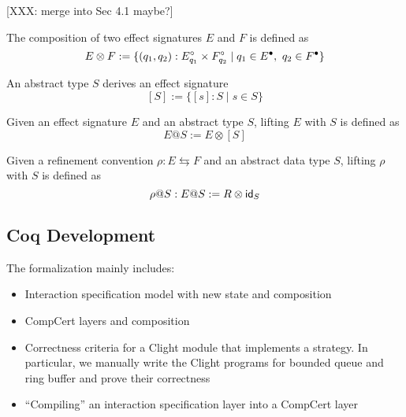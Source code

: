 \documentclass[acmsmall,review,anonymous]{acmart}\settopmatter{printfolios=true,printccs=false,printacmref=false}
\begin{document}
[XXX: merge into Sec 4.1 maybe?]

\begin{definition}
The composition of two effect signatures $E$ and $F$
is defined as
\[
  E\otimes F := \{ (q_1,q_2) : E^\circ_{q_1} \times F^\circ_{q_2} \mid q_1\in E^\bullet,\ q_2\in F^\bullet \}
\]
\end{definition}

An abstract type $S$ derives an effect signature
\[
  [S] := \{ [s]:S \mid s \in S \}
\]
\begin{definition}
Given an effect signature $E$
and an abstract type $S$,
lifting $E$ with $S$ is defined as
\[
  E@S := E \otimes [S]
\]
\end{definition}

\begin{definition}
Given a refinement convention $\rho:E \leftrightarrows F$
and an abstract data type $S$,
lifting $\rho$ with $S$ is defined as
\[
  \rho@S: E@S  := R \otimes \kw{id}_S
\]
\end{definition}


\subsection{Coq Development}

The formalization mainly includes:
\begin{itemize}
\item Interaction specification model with new state and composition
\item CompCert layers and composition
\item Correctness criteria for a Clight module that implements a strategy. In
  particular, we manually write the Clight programs for bounded queue and ring
  buffer and prove their correctness
\item ``Compiling'' an interaction specification layer into a CompCert layer
\end{itemize}
\end{document}
